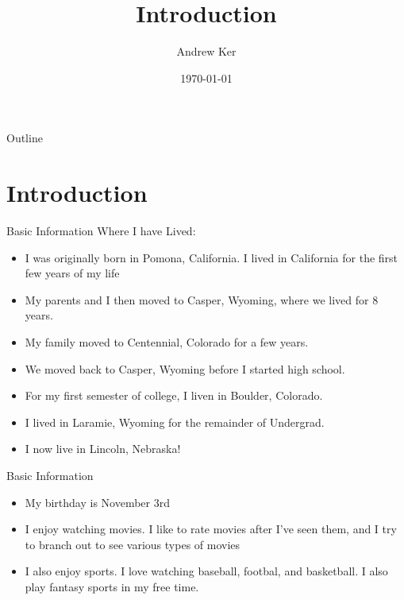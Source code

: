 \documentclass{beamer}\usepackage[]{graphicx}\usepackage[]{graphicx}\usepackage[]{xcolor}
\title{Introduction}  %
\author{Andrew Ker}                              %
\date{\today}
\begin{document}
\begin{frame}
  \titlepage
\end{frame}

\begin{frame}{Outline}
  \tableofcontents
\end{frame}

%

\section{Introduction}

\begin{frame}{Basic Information}
	Where I have Lived:
    \begin{itemize}
		\item I was originally born in Pomona, California. I lived in California for the first few years of my life
        \item My parents and I then moved to Casper, Wyoming, where we lived for 8 years.
          \item My family moved to Centennial, Colorado for a few years.
            \item We moved back to Casper, Wyoming before I started high school.
              \item For my first semester of college, I liven in Boulder, Colorado.
                \item I lived in Laramie, Wyoming for the remainder of Undergrad.
                  \item I now live in Lincoln, Nebraska!
	\end{itemize}
\end{frame}

\begin{frame}{Basic Information}
  \begin{itemize}
    \item My birthday is November 3rd
      \item I enjoy watching movies. I like to rate movies after I've seen them, and I try to branch out to see
      various types of movies
        \item I also enjoy sports. I love watching baseball, footbal, and basketball. I also play fantasy sports
        in my free time.
  \end{itemize}
\end{frame}
\end{document}
